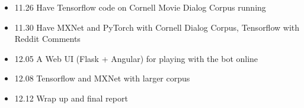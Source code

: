 \documentclass[11pt,letterpaper,twocolumn,oneside]{article}
\begin{document}
\begin{itemize}
  \item 11.26 Have Tensorflow code on Cornell Movie Dialog Corpus running
  \item 11.30 Have MXNet and PyTorch with Cornell Dialog Corpus, Tensorflow with Reddit Comments
  \item 12.05 A Web UI (Flask + Angular) for playing with the bot online
  \item 12.08 Tensorflow and MXNet with larger corpus
  \item 12.12 Wrap up and final report
\end{itemize}

\printbibliography
\end{document}
